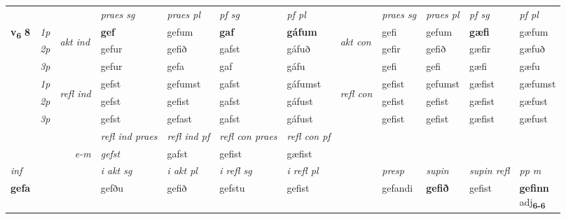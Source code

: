 \begin{longtable}[l]{X>{\footnotesize\itshape}llXXXXlXXXX}
\midrule

 & &   & \textit{praes sg}  & \textit{praes pl}    & \textit{ pf sg} & \textit{pf pl} & & \textit{praes sg}  & \textit{praes pl}    & \textit{pf sg} & \textit{pf pl }  \\ \cmidrule{4-7} \cmidrule{9-12}
 \multirow{2}{*}{{{\textbf{v{\textsubscript{6}}} \Large{\textbf{8}}}}}  & 1p & \multirow{3}{*}{\begin{turn}{90}\textit{akt ind}\end{turn}} & \textbf{gef} & gefum & \textbf{gaf} & \textbf{gáfum} & \multirow{3}{*}{\begin{turn}{90}\textit{akt con}\end{turn}} &gefi & gefum & \textbf{gæfi} & gæfum\\*
 & 2p &  &  gefur  & gefið & gafst & gáfuð & & gefir & gefið & gæfir & gæfuð \\*
 & 3p &  & gefur & gefa & gaf & gáfu & & gefi & gefi& gæfi & gæfu \\*
\cmidrule{4-7} \cmidrule{9-12}
 & 1p & \multirow{3}{*}{\begin{turn}{90}\textit{refl ind}\end{turn}}  & gefst & gefumst & gafst & gáfumst & \multirow{3}{*}{\begin{turn}{90}\textit{refl con}\end{turn}}  &gefist & gefumst & gæfist & gæfumst \\*
 & 2p &  & gefst & gefist & gafst & gáfust & &gefist & gefist & gæfist & gæfust \\*
 & 3p  & & gefst & gefast & gafst & gáfust & & gefist & gefist& gæfist & gæfust \\*
\cmidrule{4-7} \cmidrule{9-12}

 & && \textit{refl ind praes} & \textit{refl ind pf} & \textit{refl con praes} & \textit{refl con pf} \\*
\multicolumn{3}{r}{\textit{e-m}}& gefst & gafst & gefist & gæfist \\*

\cmidrule{4-7}
   {\textit{inf}} & &  & \textit{i akt sg} & \textit{i akt pl} & \textit{i refl sg} & \textit{i refl pl} && \textit{presp} & \textit{supin} & \textit{supin refl} & \textit{pp m} \\*
  {\textbf{gefa}} & && gefðu  & gefið & gefstu & gefist && gefandi &  \textbf{gefið} & gefist & \specialcell{\textbf{gefinn} \\ adj\textbf{\textsubscript{6-6}}} \\*


\end{longtable}
